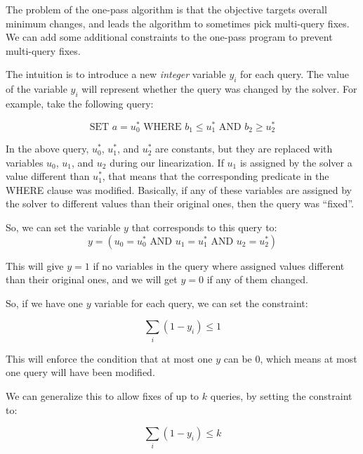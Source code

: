 \documentclass{article}
\begin{document}
The problem of the one-pass algorithm is that the objective targets overall
minimum changes, and leads the algorithm to sometimes pick multi-query fixes.
We can add some additional constraints to the one-pass program to prevent multi-query fixes.

The intuition is to introduce a new \emph{integer} variable $y_i$ for each
query. The value of the variable $y_i$ will represent whether the query was changed by the solver. For example, take the following query:

\[
\text{SET } a=u_0^* \text{ WHERE } b_1\leq u_1^* \text{ AND } b_2\geq u_2^*
\]

In the above query, $u_0^*$, $u_1^*$, and $u_2^*$ are constants, but they are replaced with
variables $u_0$, $u_1$, and $u_2$ during our linearization. If $u_1$ is assigned by
the solver a value different than $u_1^*$, that means that the corresponding predicate in the WHERE clause  was
modified.  Basically, if any of these variables are assigned by the solver to different values than their original ones, then the query was ``fixed''.

So, we can set the variable $y$ that corresponds to this query to:
\[
y= (u_0= u_0^* \text{ AND } u_1= u_1^* \text{ AND } u_2=u_2^*)
\]

This will give $y=1$ if no variables in the query where assigned values
different than their original ones, and we will get $y=0$ if any of them
changed.

So, if we have one $y$ variable for each query, we can set the constraint:

\[
\sum_i(1-y_i)\leq 1
\]

This will enforce the condition that at most one $y$ can be 0, which means at most one query will have been modified. 

We can generalize this to allow fixes of up to $k$ queries, by setting the constraint to:

\[
\sum_i(1-y_i)\leq k
\]
\end{document}
